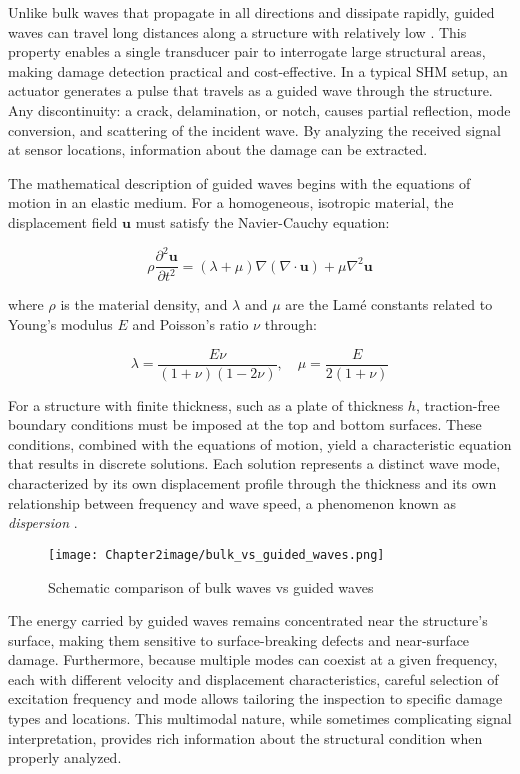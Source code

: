 \documentclass[12pt,a4paper]{report}
\begin{document}
Unlike bulk waves that propagate in all directions and dissipate rapidly, guided waves can travel long distances along a structure with relatively low \citep{Yang2025Dataset}. This property enables a single transducer pair to interrogate large structural areas, making damage detection practical and cost-effective. In a typical SHM setup, an actuator generates a pulse that travels as a guided wave through the structure. Any discontinuity: a crack, delamination, or notch, causes partial reflection, mode conversion, and scattering of the incident wave. By analyzing the received signal at sensor locations, information about the damage can be extracted.

The mathematical description of guided waves begins with the equations of motion in an elastic medium. For a homogeneous, isotropic material, the displacement field $\mathbf{u}$ must satisfy the Navier-Cauchy equation:

\begin{equation}
\rho \frac{\partial^2 \mathbf{u}}{\partial t^2} = (\lambda + \mu) \nabla (\nabla \cdot \mathbf{u}) + \mu \nabla^2 \mathbf{u}
\end{equation}

where $\rho$ is the material density, and $\lambda$ and $\mu$ are the Lamé constants related to Young's modulus $E$ and Poisson's ratio $\nu$ through:

\begin{equation}
\lambda = \frac{E\nu}{(1+\nu)(1-2\nu)}, \quad \mu = \frac{E}{2(1+\nu)}
\end{equation}

For a structure with finite thickness, such as a plate of thickness $h$, traction-free boundary conditions must be imposed at the top and bottom surfaces. These conditions, combined with the equations of motion, yield a characteristic equation that results in discrete solutions. Each solution represents a distinct wave mode, characterized by its own displacement profile through the thickness and its own relationship between frequency and wave speed, a phenomenon known as \textit{dispersion} \citep{rose2014ultrasonic}.

\begin{figure}[h!]
\centering
\texttt{[image: Chapter2image/bulk\_vs\_guided\_waves.png]}
\caption{Schematic comparison of bulk waves vs guided waves}
\end{figure}

The energy carried by guided waves remains concentrated near the structure's surface, making them sensitive to surface-breaking defects and near-surface damage. Furthermore, because multiple modes can coexist at a given frequency, each with different velocity and displacement characteristics, careful selection of excitation frequency and mode allows tailoring the inspection to specific damage types and locations. This multimodal nature, while sometimes complicating signal interpretation, provides rich information about the structural condition when properly analyzed.
\end{document}
